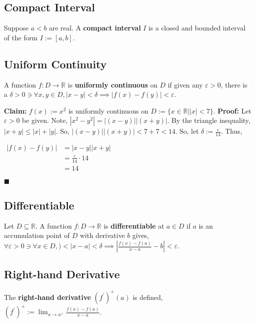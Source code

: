 \documentclass[11pt]{book}
\newcommand{\R}{\mathbb{R}}
\newcommand{\QED}{\begin{flushright}$\blacksquare$\end{flushright}}
\begin{document}
	\subsection{Compact Interval}
	\label{subsec:compact}
		\begin{defin}
			Suppose $a<b$ are real. A \textbf{compact interval} $I$ is a closed and bounded interval of the form $I := [a,b]$.
		\end{defin}
	\newpage
	\subsection{Uniform Continuity}
	\label{subsec:uniformcontinuity}
		\begin{defin}
			A function $f:D \to \R$ is \textbf{uniformly continuous} on $D$ if given any $\varepsilon > 0$, there is a $\delta > 0 \ni \forall x,y \in D, |x - y| 
			< \delta \implies |f(x) - f(y)| < \varepsilon$.
		\end{defin}
		\begin{examp}
			\textbf{Claim:} $f(x) := x^2$ is uniformly continuous on $D := \{x \in \R| |x| < 7 \}$.\hfill\break
			\textbf{Proof:} Let $\varepsilon > 0$ be given. Note, $|x^2 - y^2| = |(x-y)||(x+y)|$. By the triangle inequality, $|x+y| \leq |x| + |y|$.
			So, $|(x-y)||(x+y)| < 7 + 7 < 14$. So, let $\delta := \frac{\varepsilon}{14}$. Thus,
				\begin{center}
					\begin{math}
						\begin{aligned}
							|f(x) - f(y)| & = |x-y||x+y|\\
							& = \frac{\varepsilon}{14} \cdot 14\\
							& = 14
						\end{aligned}
					\end{math}
				\end{center}
				\QED
		\end{examp}
	\subsection{Differentiable}
	\label{subsec:differentiable}
		\begin{defin}
			Let $D \subseteq \R$. A function $f: D \to \R$ is \textbf{differentiable} at $a \in D$ if $a$ is an accumulation point of $D$ with derivative $b$ gives,
			$\forall \varepsilon > 0 \ni \forall x \in D, ) < |x -a|< \delta \implies|\frac{f(x) - f(a)}{x-a} - b| < \varepsilon$.
		\end{defin}
	\subsection{Right-hand Derivative}
	\label{subsec:rhderivative}
	\begin{defin} The \textbf{right-hand derivative} $(f^{\prime})^+(a)$ is defined, $(f^{\prime})^+ := \displaystyle\lim_{x \to a^+}{\frac{f(x) - f(a)}{x - a}}$.
	\end{defin}
\end{document}
